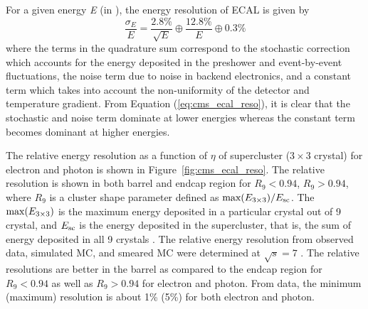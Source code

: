 For a given energy \textit{E} (in \GeV), the energy resolution of ECAL is given by 
\cite{Chatrchyan:2013dga}
\begin{equation}
	\frac{\sigma_E}{E} = \frac{2.8\%}{\sqrt{E}} \oplus \frac{12.8\%}{E} \oplus 0.3\%
	\label{eq:cms_ecal_reso}
\end{equation}
where the terms in the quadrature sum correspond to the stochastic correction which accounts
for the energy deposited in the preshower and event-by-event fluctuations, the noise term
due to noise in backend electronics, and a constant term which takes into account
the non-uniformity of the detector and temperature gradient. From 
Equation (\ref{eq:cms_ecal_reso}), it is clear that the stochastic and noise term 
dominate at lower energies whereas the constant term becomes dominant at higher energies. 

The relative energy resolution as a function of $\eta$ of supercluster 
($ 3\times 3$ crystal) for electron and photon is shown in 
Figure~\ref{fig:cms_ecal_reso}. The relative resolution is shown in both barrel and
endcap region for $R_9 < 0.94$, $R_9 > 0.94$, where $R_9$ is a cluster shape parameter 
defined as $\rm{max}(E_{3\times 3})/E_{\rm{sc}}$. The $\rm{max}(E_{3\times 3})$ is the 
maximum energy deposited in a particular crystal out of 9 crystal, and $E_{\rm{sc}}$ is
the energy deposited in the supercluster, that is, the sum of energy deposited in all 9
crystals \cite{Chatrchyan:2013dga}. The relative energy resolution from observed data,
simulated MC, and smeared MC were determined 
at $\sqrt{s} = 7$ \TeV. The relative resolutions are better in the barrel as compared to 
the endcap region for $R_9 < 0.94$ as well as $R_9 > 0.94$ for electron and photon. From data, 
the minimum (maximum) resolution is about 1\% (5\%) for both electron and photon.

